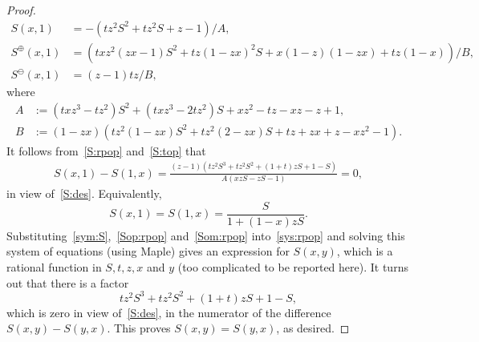 \documentclass[12pt]{amsart}
\numberwithin{equation}{section}
\theoremstyle{plain}
\theoremstyle{definition}
\begin{document}
\begin{proof}
\begin{align}
 S(x,1)&=-(tz^2S^2+tz^2S+z-1)/A,\label{S:rpop}\\
 S^{\oplus}(x,1)&=(txz^2(zx-1)S^2+tz(1-zx)^2S+x(1-z)(1-zx)+tz(1-x))/B,\label{Sop:rpop}\\
S^{\ominus}(x,1)&=(z-1)tz/B\label{Som:rpop},
\end{align}
where 
\begin{align*}
A&:=(txz^3-tz^2)S^2+(txz^3-2tz^2)S+xz^2-tz-xz-z+1,\\
B&:=(1-zx)(tz^2(1-zx)S^2+tz^2(2-zx)S+tz+zx+z-xz^2-1).
\end{align*}
It follows from~\eqref{S:rpop} and~\eqref{S:top} that 
\begin{align*}
S(x,1)-S(1,x)=\frac{(z-1)(tz^2S^3+tz^2S^2+(1+t)zS+1-S)}{A(xzS-zS-1)}=0,
\end{align*}
in view of~\eqref{S:des}.  Equivalently, 
\begin{equation}\label{sym:S}
S(x,1)=S(1,x)=\frac{S}{1+(1-x)zS}.
\end{equation}
 Substituting~\eqref{sym:S},~\eqref{Sop:rpop} and~\eqref{Som:rpop} into~\eqref{sys:rpop} and solving this system of equations (using Maple) gives an expression for $S(x,y)$, which is a rational function in $S,t,z,x$ and $y$ (too complicated  to be reported here). It turns out that there is a factor 
 $$tz^2S^3+tz^2S^2+(1+t)zS+1-S,$$ which is zero in view of~\eqref{S:des}, in the numerator of the   difference $S(x,y)-S(y,x)$. This proves $S(x,y)=S(y,x)$, as desired. 
\end{proof}
\end{document}
